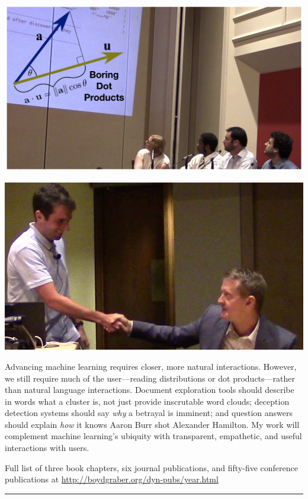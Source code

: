 \documentclass[11pt]{amsart}
\begin{document}
  \begin{minipage}[b]{0.4\textwidth}
    \includegraphics[width=\textwidth]{images/boring_dot_products}
  \end{minipage}
  \hfill
\begin{minipage}[b]{0.4\textwidth}
    \includegraphics[width=\textwidth]{images/jennings_handshake}
  \end{minipage}


Advancing machine learning requires closer, more natural interactions.  However,
we still require much of the user---reading distributions or dot
products---rather than natural language interactions.  Document exploration
tools should describe in words what a cluster is, not just provide inscrutable
word clouds; deception detection systems should say \emph{why} a betrayal is
imminent; and question answers should explain \emph{how} it knows Aaron Burr
shot Alexander Hamilton. My work will complement machine learning's ubiquity
with transparent, empathetic, and useful interactions with users.
\clearpage
\small


\begin{center}
Full list of  three book chapters, six journal publications, and fifty-five conference
publications at \url{http://boydgraber.org/dyn-pubs/year.html}
\end{center}

%

\noindent\rule{4cm}{0.4pt}
\end{document}
